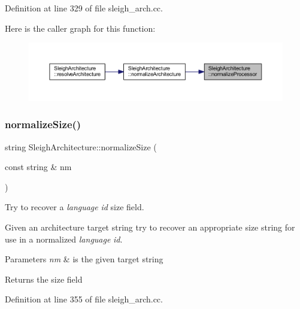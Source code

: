 Definition at line 329 of file sleigh\+\_\+arch.\+cc.

Here is the caller graph for this function\+:
\nopagebreak
\begin{figure}[H]
\begin{center}
\leavevmode
\includegraphics[width=350pt]{class_sleigh_architecture_a01c91ee1ad3c886ddc13df95502489c1_icgraph}
\end{center}
\end{figure}
\mbox{\label{class_sleigh_architecture_a4645a63583ea3f8088e24d6fa71dce50}} 
\subsubsection{\texorpdfstring{normalizeSize()}{normalizeSize()}}
{\footnotesize\ttfamily string Sleigh\+Architecture\+::normalize\+Size (\begin{DoxyParamCaption}\item[{const string \&}]{nm }\end{DoxyParamCaption})\hspace{0.3cm}{\ttfamily [static]}}



Try to recover a {\itshape language} {\itshape id} size field. 

Given an architecture target string try to recover an appropriate size string for use in a normalized {\itshape language} {\itshape id}. 
\begin{DoxyParams}{Parameters}
{\em nm} & is the given target string \\
\hline
\end{DoxyParams}
\begin{DoxyReturn}{Returns}
the size field 
\end{DoxyReturn}


Definition at line 355 of file sleigh\+\_\+arch.\+cc.

